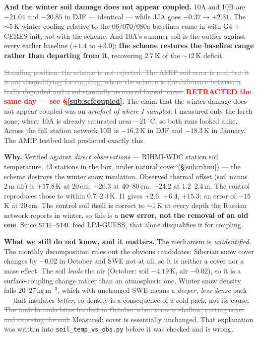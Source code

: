 \documentclass[10pt]{article}
\newcommand{\dead}[1]{\textcolor{gray}{\sout{#1}}}
\begin{document}
\textbf{And the winter soil damage does not appear coupled.} 10A and 10B are $-21.04$ and
$-20.85$ in DJF --- identical --- while JJA goes $-0.37 \to +2.31$. The ${\sim}5$\,K winter
cooling relative to the 06/070/080a baselines came in with G4 $+$ CERES-init, \emph{not} with
the scheme. And 10A's summer soil is the outlier against every earlier baseline
($+1.4$ to $+3.0$); \textbf{the scheme restores the baseline range rather than departing from
it}, recovering $2.7$\,K of the ${\sim}12$\,K deficit.

\dead{Standing position: the scheme is not rejected. The AMIP soil error is real, but it is
not disqualifying for coupling, where the scheme is the difference between a badly degraded
and a substantially recovered boreal forest.} \textcolor{red}{\textbf{RETRACTED the same day
--- see \S\ref{sub:scfcoupled}.}} The claim that the winter damage does not appear coupled was
an \emph{artefact of where I sampled}: I measured only the larch zone, where 10A is already
saturated near $-21\,^\circ$C, so both runs looked alike. Across the full station network 10B
is $-16.2$\,K in DJF and $-18.3$\,K in January. The AMIP testbed had predicted exactly this.

\textbf{Why.} Verified against \emph{direct observations} --- RIHMI-WDC station soil
temperature, 43 stations in the box, under natural cover (\S\ref{sub:rihmi}) --- the scheme
destroys the winter snow insulation. Observed thermal offset (soil minus 2\,m air) is
$+17.8$\,K at 20\,cm, $+20.3$ at 40--80\,cm, $+24.2$ at 1.2--2.4\,m. The control reproduces
those to within $0.7$--$2.3$\,K. I1 gives $+2.6$, $+6.4$, $+15.3$: an error of $-15$\,K at
20\,cm. The control soil itself is correct to ${\sim}1$\,K at every depth the Russian network
reports in winter, so this is a \textbf{new error, not the removal of an old one}. Since
\texttt{ST1L}--\texttt{ST4L} feed LPJ-GUESS, that alone disqualifies it for coupling.

\textbf{What we still do not know, and it matters.} The mechanism is \emph{unidentified}. The
monthly decomposition rules out the obvious candidates: Siberian snow cover changes by
$-0.02$ in October and SWE not at all, so it is neither a cover nor a mass effect. The soil
\emph{leads} the air (October: soil $-4.19$\,K, air $-0.02$), so it is a surface-coupling
change rather than an atmospheric one. Winter snow density falls $20$--$27$\,kg\,m$^{-3}$,
which with unchanged SWE means a \emph{deeper, less dense} pack --- that insulates
\emph{better}, so density is a consequence of a cold pack, not its cause.
\dead{The tanh formula bites hardest in October when snow is shallow, cutting cover and
exposing the soil.} Measured: cover is essentially unchanged. That explanation was written
into \texttt{soil\_temp\_vs\_obs.py} before it was checked and is wrong.
\end{document}
